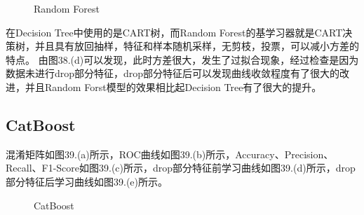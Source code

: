 \documentclass[../main.tex]{subfiles}
\begin{document}
        \begin{figure}[H]
            \centering


            \caption{Random Forest}
        \end{figure}

        在Decision Tree中使用的是CART树，而Random Forest的基学习器就是CART决策树，并且具有放回抽样，特征和样本随机采样，无剪枝，投票，可以减小方差的特点。
        由图38.(d)可以发现，此时方差很大，发生了过拟合现象，经过检查是因为数据未进行drop部分特征，drop部分特征后可以发现曲线收敛程度有了很大的改进，并且Random Forst模型的效果相比起Decision Tree有了很大的提升。

    \subsection{CatBoost}

        混淆矩阵如图39.(a)所示，ROC曲线如图39.(b)所示，Accuracy、Precision、Recall、F1-Score如图39.(c)所示，drop部分特征前学习曲线如图39.(d)所示，drop部分特征后学习曲线如图39.(e)所示。

        \begin{figure}[H]
            \centering


            \caption{CatBoost}
        \end{figure}
\end{document}
